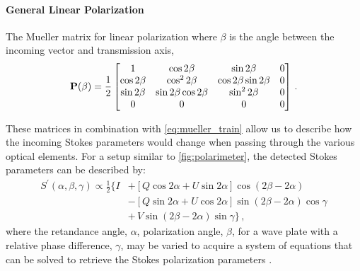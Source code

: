 \paragraph{General Linear Polarization}
The Mueller matrix for linear polarization where $\beta$ is the angle between the incoming vector and transmission axis,
\begin{equation} \label{matrix:polarizer}
    \mathbf{P}(\beta) = \frac{1}{2}
    \begin{bmatrix}
        1            & \cos 2 \beta              & \sin 2 \beta              & 0 \\
        \cos 2 \beta & \cos^{2} 2 \beta          & \cos 2 \beta \sin 2 \beta & 0 \\
        \sin 2 \beta & \sin 2 \beta \cos 2 \beta & \sin^{2} 2 \beta          & 0 \\
        0            & 0                         & 0                         & 0 \\
    \end{bmatrix}\,.
\end{equation}

These matrices in combination with \autoref{eq:mueller_train} allow us to describe how the incoming Stokes parameters would change when passing through the various optical elements.
For a setup similar to \autoref{fig:polarimeter}, the detected Stokes parameters can be described by:
\begin{equation} \label{eq:Stokes_intensity}
    \begin{split}
        S^{\prime}(\alpha, \beta, \gamma) \propto \frac{1}{2} \{ I & + [Q \cos2\alpha + U \sin2\alpha] \cos(2\beta - 2\alpha) \\
        & - [Q \sin2\alpha + U \cos2\alpha] \sin(2\beta - 2\alpha) \cos\gamma\\
        & + \,V \sin(2\beta - 2\alpha)\sin\gamma \}\,,
    \end{split}
\end{equation}
where the retandance angle, $\alpha$, polarization angle, $\beta$, for a wave plate with a relative phase difference, $\gamma$, may be varied to acquire a system of equations that can be solved to retrieve the Stokes polarization parameters \citep{waveplate_in_specpol}.

\enlargethispage{-2\baselineskip}

